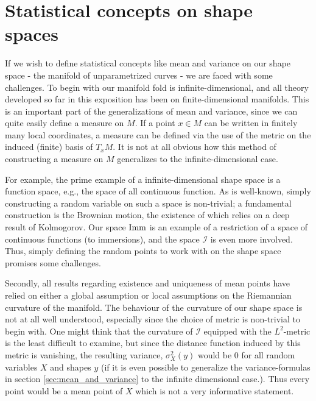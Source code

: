 \section{Statistical concepts on shape spaces}
\label{sec:statistical_concepts_on_shape_space}

If we wish to define statistical concepts like mean and variance on our shape space - the manifold of unparametrized curves - we are faced with some challenges. To begin with our manifold fold is infinite-dimensional, and all theory developed so far in this exposition has been on finite-dimensional manifolds. This is an important part of the generalizations of mean and variance, since we can quite easily define a measure on $M$. If a point $x \in M$ can be written in finitely many local coordinates, a measure can be defined via the use of the metric on the induced (finite) basis of $T_x M$. It is not at all obvious how this method of constructing a measure on $M$ generalizes to the infinite-dimensional case.

For example, the prime example of a infinite-dimensional shape space is a function space, e.g., the space of all continuous function. As is well-known, simply constructing a random variable on such a space is non-trivial; a fundamental construction is the Brownian motion, the existence of which relies on a deep result of Kolmogorov. Our space $\mathop{}\!\mathrm{Imm}$ is an example of a restriction of a space of continuous functions (to immersions), and the space $\mathcal{I}$ is even more involved. Thus, simply defining the random points to work with on the shape space promises some challenges.

Secondly, all results regarding existence and uniqueness of mean points have relied on either a global assumption or local assumptions on the Riemannian curvature of the manifold. The behaviour of the curvature of our shape space is not at all well understood, especially since the choice of metric is non-trivial to begin with. One might think that the curvature of $\mathcal{I}$ equipped with the $L^2$-metric is the least difficult to examine, but since the distance function induced by this metric is vanishing, the resulting variance, $\sigma^2_X(y)$ would be $0$ for all random variables $X$ and shapes $y$ (if it is even possible to generalize the variance-formulas in section \ref{sec:mean_and_variance} to the infinite dimensional case.). Thus every point would be a mean point of $X$ which is not a very informative statement.

